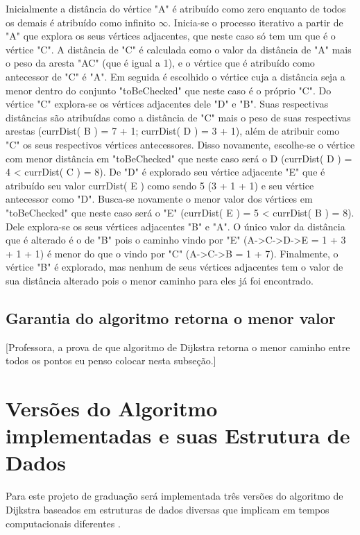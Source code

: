 Inicialmente a distância do vértice "A" é atribuído como zero enquanto de todos os demais é atribuído como infinito $\infty$. Inicia-se o processo iterativo a partir de "A" que explora os seus vértices adjacentes, que neste caso só tem um que é o vértice "C". A distância de "C" é calculada como o valor da distância de "A" mais o peso da aresta "AC" (que é igual a 1), e o vértice que é atribuído como antecessor de "C" é "A". Em seguida é escolhido o vértice cuja a distância seja a menor dentro do conjunto "toBeChecked" que neste caso é o próprio "C". Do vértice "C" explora-se os vértices adjacentes dele "D" e "B". Suas respectivas distâncias são atribuídas como a distância de "C" mais o peso de suas respectivas arestas (currDist( B ) = 7 + 1; currDist( D ) = 3 + 1), além de atribuir como "C" os seus respectivos vértices antecessores. Disso novamente, escolhe-se o vértice com menor distância em "toBeChecked" que neste caso será o D (currDist( D ) = 4 < currDist( C ) = 8). De "D" é explorado seu vértice adjacente "E" que é atribuído seu valor currDist( E ) como sendo 5 (3 + 1 + 1) e seu vértice antecessor como "D". Busca-se novamente o menor valor dos vértices em "toBeChecked" que neste caso será o "E" (currDist( E ) = 5 < currDist( B ) = 8). Dele explora-se os seus vértices adjacentes "B" e "A". O único valor da distância que é alterado é o de "B" pois o caminho vindo por "E" (A->C->D->E = 1 + 3 + 1 + 1) é menor do que o vindo por "C"  (A->C->B = 1 + 7). Finalmente, o vértice "B" é explorado, mas nenhum de seus vértices adjacentes tem o valor de sua distância alterado pois o menor caminho para eles já foi encontrado.


\subsection{Garantia do algoritmo retorna o menor valor}
\label{sec-dijkstra-algoritmo-prova}
[Professora, a prova de que algoritmo de Dijkstra retorna o menor caminho entre todos os pontos eu penso colocar nesta subseção.]

\section{Versões do Algoritmo implementadas e suas Estrutura de Dados}
\label{sec-dijkstra-versoes}
Para este projeto de graduação será implementada três versões do algoritmo de Dijkstra baseados em estruturas de dados diversas que implicam em tempos computacionais diferentes \cite{cormen2009introduction}.

